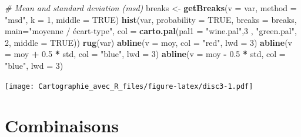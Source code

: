 \documentclass[]{book}
\newenvironment{Shaded}{\begin{snugshade}}{\end{snugshade}}
\newcommand{\CommentTok}[1]{\textcolor[rgb]{0.56,0.35,0.01}{\textit{#1}}}
\newcommand{\DataTypeTok}[1]{\textcolor[rgb]{0.13,0.29,0.53}{#1}}
\newcommand{\DecValTok}[1]{\textcolor[rgb]{0.00,0.00,0.81}{#1}}
\newcommand{\FloatTok}[1]{\textcolor[rgb]{0.00,0.00,0.81}{#1}}
\newcommand{\KeywordTok}[1]{\textcolor[rgb]{0.13,0.29,0.53}{\textbf{#1}}}
\newcommand{\NormalTok}[1]{#1}
\newcommand{\OperatorTok}[1]{\textcolor[rgb]{0.81,0.36,0.00}{\textbf{#1}}}
\newcommand{\OtherTok}[1]{\textcolor[rgb]{0.56,0.35,0.01}{#1}}
\newcommand{\StringTok}[1]{\textcolor[rgb]{0.31,0.60,0.02}{#1}}
\begin{document}
\begin{Shaded}
\begin{Highlighting}[]
\CommentTok{# Mean and standard deviation (msd)}
\NormalTok{breaks <-}\StringTok{ }\KeywordTok{getBreaks}\NormalTok{(}\DataTypeTok{v =}\NormalTok{ var, }\DataTypeTok{method =} \StringTok{"msd"}\NormalTok{, }\DataTypeTok{k =} \DecValTok{1}\NormalTok{, }\DataTypeTok{middle =} \OtherTok{TRUE}\NormalTok{)}
\KeywordTok{hist}\NormalTok{(var, }\DataTypeTok{probability =} \OtherTok{TRUE}\NormalTok{, }\DataTypeTok{breaks =}\NormalTok{ breaks, }\DataTypeTok{main=}\StringTok{"moyenne / écart-type"}\NormalTok{,}
     \DataTypeTok{col =} \KeywordTok{carto.pal}\NormalTok{(}\DataTypeTok{pal1 =} \StringTok{"wine.pal"}\NormalTok{,}\DecValTok{3}\NormalTok{ , }\StringTok{"green.pal"}\NormalTok{, }\DecValTok{2}\NormalTok{, }\DataTypeTok{middle =} \OtherTok{TRUE}\NormalTok{))}
\KeywordTok{rug}\NormalTok{(var)}
\KeywordTok{abline}\NormalTok{(}\DataTypeTok{v =}\NormalTok{ moy, }\DataTypeTok{col =} \StringTok{"red"}\NormalTok{, }\DataTypeTok{lwd =} \DecValTok{3}\NormalTok{)}
\KeywordTok{abline}\NormalTok{(}\DataTypeTok{v =}\NormalTok{ moy }\OperatorTok{+}\StringTok{ }\FloatTok{0.5} \OperatorTok{*}\StringTok{ }\NormalTok{std, }\DataTypeTok{col =} \StringTok{"blue"}\NormalTok{, }\DataTypeTok{lwd =} \DecValTok{3}\NormalTok{)}
\KeywordTok{abline}\NormalTok{(}\DataTypeTok{v =}\NormalTok{ moy }\OperatorTok{-}\StringTok{ }\FloatTok{0.5} \OperatorTok{*}\StringTok{ }\NormalTok{std, }\DataTypeTok{col =} \StringTok{"blue"}\NormalTok{, }\DataTypeTok{lwd =} \DecValTok{3}\NormalTok{)}
\end{Highlighting}
\end{Shaded}

\texttt{[image: Cartographie\_avec\_R\_files/figure-latex/disc3-1.pdf]}

\hypertarget{combinaisons}{%
\section{Combinaisons}\label{combinaisons}}
\end{document}
